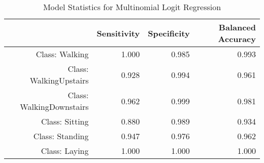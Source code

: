 \begin{table}[ht]
\centering
\caption{Model Statistics for Multinomial Logit Regression} 
\label{tab:conmat_stats_dmr}
\begin{tabular}{rrrr}
  \hline
 & Sensitivity & Specificity & Balanced Accuracy \\ 
  \hline
Class: Walking & 1.000 & 0.985 & 0.993 \\ 
  Class: WalkingUpstairs & 0.928 & 0.994 & 0.961 \\ 
  Class: WalkingDownstairs & 0.962 & 0.999 & 0.981 \\ 
  Class: Sitting & 0.880 & 0.989 & 0.934 \\ 
  Class: Standing & 0.947 & 0.976 & 0.962 \\ 
  Class: Laying & 1.000 & 1.000 & 1.000 \\ 
   \hline
\end{tabular}
\end{table}
